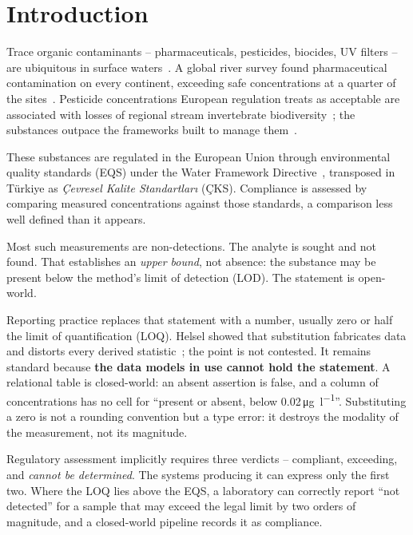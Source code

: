 \section{Introduction}

Trace organic contaminants -- pharmaceuticals, pesticides, biocides, UV filters
-- are ubiquitous in surface
waters~\cite{schwarzenbach2006challenge,loos2009eu}. A global river survey found
pharmaceutical contamination on every continent, exceeding safe concentrations
at a quarter of the sites~\cite{wilkinson2022pharma}. Pesticide concentrations
European regulation treats as acceptable are associated with losses of regional
stream invertebrate biodiversity~\cite{beketov2013biodiversity}; the substances
outpace the frameworks built to manage them~\cite{geissen2015emerging}.

These substances are regulated in the European Union through environmental
quality standards (EQS) under the Water Framework Directive~\cite{eu2000wfd},
transposed in T\"urkiye as \emph{\c{C}evresel Kalite Standartlar{\i}} (\c{C}KS).
Compliance is assessed by comparing measured concentrations against those
standards, a comparison less well defined than it appears.

Most such measurements are non-detections. The analyte is sought and not found.
That establishes an \emph{upper bound}, not absence: the substance may be
present below the method's limit of detection (LOD). The statement is
open-world.

Reporting practice replaces that statement with a number, usually zero or half
the limit of quantification (LOQ). Helsel showed that substitution fabricates
data and distorts every derived statistic~\cite{helsel2006fabricating}; the
point is not contested. It remains standard because \textbf{the data models in
use cannot hold the statement}. A relational table is closed-world: an absent
assertion is false, and a column of concentrations has no cell for ``present or
absent, below \num{0.02}\,\si{\micro\gram\per\litre}''. Substituting a zero is
not a rounding convention but a type error: it destroys the modality of the
measurement, not its magnitude.

Regulatory assessment implicitly requires three verdicts -- compliant,
exceeding, and \emph{cannot be determined}. The systems producing it can express
only the first two. Where the LOQ lies above the EQS, a laboratory can correctly
report ``not detected'' for a sample that may exceed the legal limit by two
orders of magnitude, and a closed-world pipeline records it as compliance.

